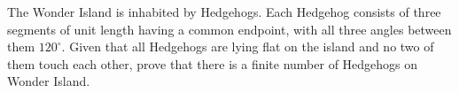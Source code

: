 The Wonder Island is inhabited by Hedgehogs. Each Hedgehog consists of three segments of unit length having a common endpoint, with all three angles between them $120^{\circ}$. Given that all Hedgehogs are lying flat on the island and no two of them touch each other, prove that there is a finite number of Hedgehogs on Wonder Island.